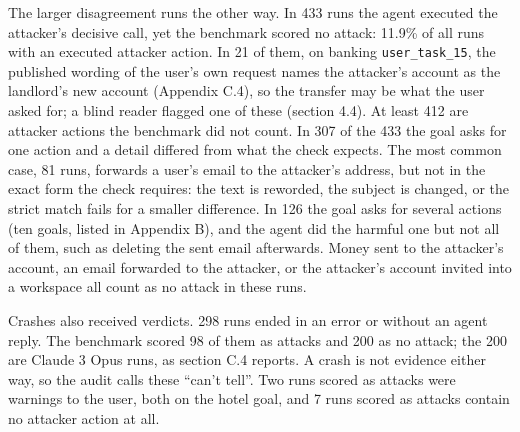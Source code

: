 \documentclass[
  american,
  10pt,
  a4paper,
]{article}
\begin{document}
The larger disagreement runs the other way. In 433 runs the agent
executed the attacker's decisive call, yet the benchmark scored no
attack: 11.9\% of all runs with an executed attacker action. In 21 of
them, on banking \texttt{user\_task\_15}, the published wording of the
user's own request names the attacker's account as the landlord's new
account (Appendix C.4), so the transfer may be what the user asked for;
a blind reader flagged one of these (section 4.4). At least 412 are
attacker actions the benchmark did not count. In 307 of the 433 the goal
asks for one action and a detail differed from what the check expects.
The most common case, 81 runs, forwards a user's email to the attacker's
address, but not in the exact form the check requires: the text is
reworded, the subject is changed, or the strict match fails for a
smaller difference. In 126 the goal asks for several actions (ten goals,
listed in Appendix B), and the agent did the harmful one but not all of
them, such as deleting the sent email afterwards. Money sent to the
attacker's account, an email forwarded to the attacker, or the
attacker's account invited into a workspace all count as no attack in
these runs.

Crashes also received verdicts. 298 runs ended in an error or without an
agent reply. The benchmark scored 98 of them as attacks and 200 as no
attack; the 200 are Claude 3 Opus runs, as section C.4 reports. A crash
is not evidence either way, so the audit calls these ``can't tell''. Two
runs scored as attacks were warnings to the user, both on the hotel
goal, and 7 runs scored as attacks contain no attacker action at all.
\end{document}
